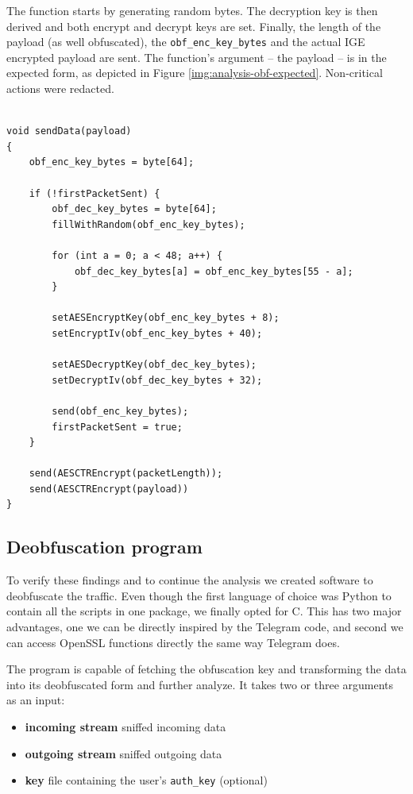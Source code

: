 \documentclass[thesis=M,english]{FITthesis}[2012/10/20]
\newcommand{\cpp}{C\nolinebreak\hspace{-.05em}\raisebox{.4ex}{\tiny +}\nolinebreak\hspace{-.10em}\raisebox{.4ex}{\tiny +}}
\begin{document}
\begin{listing}[htb]
\caption{The function starts by generating random bytes. The decryption key is then derived and both encrypt and decrypt keys are set. Finally, the length of the payload (as well obfuscated), the \texttt{obf\_enc\_key\_bytes} and the actual IGE encrypted payload are sent. The function's argument -- the payload -- is in the expected form, as depicted in Figure \ref{img:analysis-obf-expected}. Non-critical actions were redacted.}
\label{lst:analysis-obfuscation}
\begin{verbatim}

void sendData(payload)
{
    obf_enc_key_bytes = byte[64];

    if (!firstPacketSent) {
        obf_dec_key_bytes = byte[64];
        fillWithRandom(obf_enc_key_bytes);

        for (int a = 0; a < 48; a++) {
            obf_dec_key_bytes[a] = obf_enc_key_bytes[55 - a];
        }

        setAESEncryptKey(obf_enc_key_bytes + 8);
        setEncryptIv(obf_enc_key_bytes + 40);

        setAESDecryptKey(obf_dec_key_bytes);
        setDecryptIv(obf_dec_key_bytes + 32);
        
        send(obf_enc_key_bytes);
        firstPacketSent = true;
    }

    send(AESCTREncrypt(packetLength));
    send(AESCTREncrypt(payload))
}
\end{verbatim}
\end{listing}

\subsection{Deobfuscation program}

To verify these findings and to continue the analysis we created software to deobfuscate the traffic. Even though the first language of choice was Python to contain all the scripts in one package, we finally opted for \cpp. This has two major advantages, one we can be directly inspired by the Telegram code, and second we can access OpenSSL functions directly the same way Telegram does.

The program is capable of fetching the obfuscation key and transforming the data into its deobfuscated form and further analyze. It takes two or three arguments as an input:

\begin{itemize}

	\item \textbf{incoming stream} sniffed incoming data
	\item \textbf{outgoing stream} sniffed outgoing data
	\item \textbf{key} file containing the user's \texttt{auth\_key} (optional)

\end{itemize}
\end{document}
